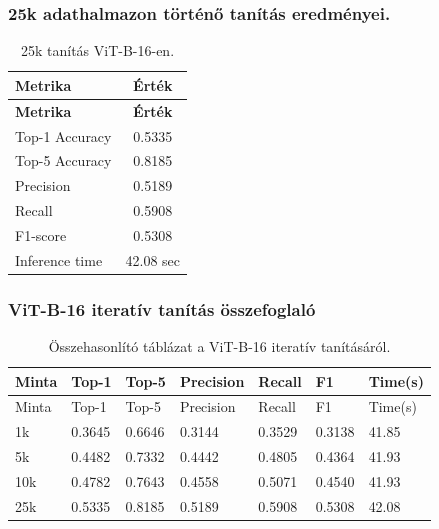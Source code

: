     \subsubsection{25k adathalmazon történő tanítás eredményei.}
      \begin{center}
        \begin{longtable}{l c}
        \caption{25k tanítás ViT-B-16-en.} \label{tab:phase03_ViT-B-16_25k} \\
        \toprule
        \textbf{Metrika} & \textbf{Érték} \\
        \midrule
        \endfirsthead
        \toprule
        \textbf{Metrika} & \textbf{Érték} \\
        \midrule
        \endhead
        Top-1 Accuracy & 0.5335 \\
        Top-5 Accuracy & 0.8185 \\
        Precision      & 0.5189 \\
        Recall         & 0.5908 \\
        F1-score       & 0.5308 \\
        Inference time & 42.08 sec \\
        \bottomrule
        \end{longtable}
      \end{center}
    
    \subsubsection{ViT-B-16 iteratív tanítás összefoglaló}
      \begin{center}
        \begin{longtable}{lllllll}
        \caption{Összehasonlító táblázat a ViT-B-16 iteratív tanításáról.}\label{tab:phase3_ViT-B-16_summary_table}\\
        \toprule
        Minta & Top-1 & Top-5 & Precision & Recall & F1 & Time(s) \\
        \midrule
        \endfirsthead
        \toprule
        Minta & Top-1 & Top-5 & Precision & Recall & F1 & Time(s) \\
        \midrule
        \endhead
        1k & 0.3645 & 0.6646 & 0.3144 & 0.3529 & 0.3138 & 41.85 \\
        5k & 0.4482 & 0.7332 & 0.4442 & 0.4805 & 0.4364 & 41.93 \\
        10k & 0.4782 & 0.7643 & 0.4558 & 0.5071 & 0.4540 & 41.93 \\
        25k & 0.5335 & 0.8185 & 0.5189 & 0.5908 & 0.5308 & 42.08 \\
        \bottomrule
        \end{longtable}
      \end{center}
    
